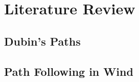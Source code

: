 
\chapter{Literature Review}
\label{litrev}

\ifpdf
    \graphicspath{{Chapter2/Figs/Raster/}{Chapter2/Figs/PDF/}{Chapter2/Figs/}}
\else
    \graphicspath{{Chapter2/Figs/Vector/}{Chapter2/Figs/}}
\fi

\section{Dubin's Paths}
\label{litrev:dubins}


\section{Path Following in Wind}
\label{litrev:path}

